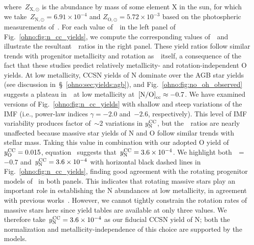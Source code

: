 where~$Z_{\text{X},\odot}$ is the abundance by mass of some element X in the
sun, for which we take~$Z_{\text{N},\odot} = 6.91\times10^{-4}$ and
$Z_{\text{O},\odot} = 5.72\times10^{-3}$ based on the photospheric measurements
of~\citet{Asplund2009}.
For each value of~~in the left panel of Fig.~\ref{ohno:fig:n_cc_yields}, we
compute the corresponding values of~~and illustrate the
resultant~\no\subcc~ratios in the right panel.
These yield ratios follow similar trends with progenitor metallicity and
rotation as~~itself, a consequence of the fact that these
studies predict relatively metallicity- and rotation-independent O yields.
At low metallicity, CCSN yields of N dominate over the AGB star yields (see
discussion in~\S~\ref{ohno:sec:yields:agb}), and Fig.~\ref{ohno:fig:no_oh_observed}
suggests a plateau in~\no~at low metallicity at~$\text{[N/O]}_\text{cc}\approx-0.7$.
We have examined versions of Fig.~\ref{ohno:fig:n_cc_yields} with shallow and steep
variations of the~\citet{Kroupa2001} IMF (i.e., power-law indices
$\gamma = -2.0$ and~$-2.6$, respectively).
This level of IMF variability produces factor of~$\sim$$2$ variations in
$y_\text{N}^\text{CC}$, but the~\no\subcc~ratios are nearly unaffected because massive star
yields of N and O follow similar trends with stellar mass.
Taking this value in combination with our adopted O yield of~$y_\text{O}^\text{CC} = 0.015$,
equation~ suggests that~$y_\text{N}^\text{CC} = 3.6\times10^{-4}$.
We highlight both~\no\subcc~=~$-0.7$ and~$y_\text{N}^\text{CC} = 3.6\times10^{-4}$ with
horizontal black dashed lines in Fig.~\ref{ohno:fig:n_cc_yields}, finding good
agreement with the rotating progenitor models of~\citet{Limongi2018} in both
panels.
This indicates that rotating massive stars play an important role in
establishing the N abundances at low metallicity, in agreement with previous
works~\citep{Chiappini2003, Chiappini2005, Chiappini2006, Kobayashi2011,
Prantzos2018, Grisoni2021}.
However, we cannot tightly constrain the rotation rates of massive stars here
since yield tables are available at only three values.
We therefore take~$y_\text{N}^\text{CC} = 3.6\times10^{-4}$ as our fiducial CCSN yield of N;
both the normalization and metallicity-independence of this choice are
supported by the~\citet{Limongi2018} models.

